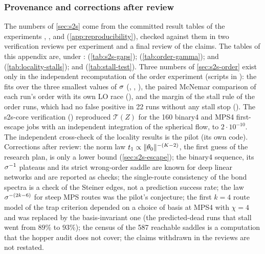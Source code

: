 \subsubsection{Provenance and corrections after review}\label{app:supp-s2s-provenance}
{\sloppy
The numbers of \cref{sec:s2s} come from the committed result tables of the experiments ,
,  and  (\cref{app:reproducibility}), checked against them in two
verification reviews per experiment and a final review of the claims. The tables of this appendix are, under
:  (\cref{tab:s2s-gaps});
 (\cref{tab:order-gamma});  and
 (\cref{tab:locality-stalls}); and
 (\cref{tab:stall-test}). Three numbers of \cref{sec:s2s-order} exist only in
the independent recomputation of the order experiment (scripts in ): the fits
over the three smallest values of $\sigma$ (, , ), the paired McNemar
comparison of each run's order with its own LO race (), and the margin of the stall rule of the
order runs, which had no false positive in 22 runs without any stall stop (). The s2s-core
verification () reproduced $\mathcal{T}(Z)$ for the 160 binary4 and MPS4 first-escape jobs with an independent integration of the spherical
flow, to $2\cdot10^{-10}$. The independent cross-check of the locality results is the pilot
 (its own code). Corrections after review: the norm law
$t_{1}\propto\lVert\theta_0\rVert^{-(K-2)}$, the first guess of the research plan, is only a lower bound
(\cref{sec:s2s-escape}); the binary4 sequence, its $\sigma^{-1}$ plateaus and its strict wrong-order saddle are known for
deep linear networks and are reported as checks; the single-route consistency of the bond spectra is a check of the
Steiner edges, not a prediction success rate; the law $\sigma^{-(2k-6)}$ for steep MPS routes was the pilot's conjecture;
the first $k=4$ route model of the trap criterion depended on a choice of basis at MPS4 with $\chi=4$ and was replaced by
the basis-invariant one (the predicted-dead runs that stall went from $89\%$ to $93\%$); the census of the 587 reachable
saddles is a computation that the hopper audit does not cover; the claims withdrawn in the reviews are not
restated.\par}
